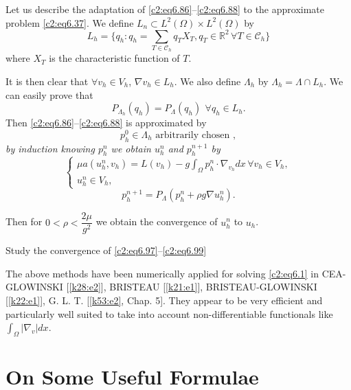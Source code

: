Let us describe the adaptation of \eqref{c2:eq6.86}--\eqref{c2:eq6.88} to the approximate
problem \eqref{c2:eq6.37}. We define $L_n \subset L^2 (\Omega) \times L^2
(\Omega)$ by  
$$ 
L_h = \{q_h : q_h = \sum_{T \in \mathscr{C}_h} q_T X_T, q_T
\in \mathbb{R}^2 \, \forall  T \in  \mathscr{C}_h\} 
$$\pageoriginale 
where $X_T$ is the characteristic function of $T$.

It is then clear that $\forall v_h \in V_h$, $\nabla v_h \in
L_h$. We also define $\Lambda_h$ by $\Lambda_h = \Lambda \cap L_h$. We
can easily prove that  
$$
P_{\Lambda_{h}} (q_h) = P_\Lambda (q_h) ~\, \forall  q_h \in L_h.
$$
Then \eqref{c2:eq6.86}--\eqref{c2:eq6.88} is approximated by
\begin{equation}
p^0_h \in \Lambda_h \text { arbitrarily chosen },
\tag{6.97}\label{c2:eq6.97} 
\end{equation}
\textit {by induction knowing $p^n_h$ we obtain $u^n_h$ and
  $p^{n+1}_h$ by} 
\begin{equation}
\begin{cases}
\mu a (u^n_h, v_h) = L (v_h)-g \int_\Omega p^n_h \cdot
\nabla_{v_{h}} dx\, \forall  v_h \in V_h,\\ 
u^n_h \in V_h, \tag{6.98}\label{c2:eq6.98} 
\end{cases}
\end{equation}
\begin{equation}
p^{n+1}_h = P_\Lambda (p^n_h + \rho g \nabla u^n_h).\tag{6.99}\label{c2:eq6.99} 
\end{equation}

Then for $0 < \rho < \dfrac{2 \mu}{g^2}$ we obtain the convergence of
$u^n_h$ to $u_h$. 

\begin{exercise}\label{c2:exer6.6} %
Study the convergence  of \eqref{c2:eq6.97}--\eqref{c2:eq6.99} 
\end{exercise}

\begin{remark}\label{c2:rem6.9}%
The above methods have been numerically applied for solving \eqref{c2:eq6.1} in
CEA-GLOWINSKI [\ref{k28:e2}], BRISTEAU [\ref{k21:e1}],
BRISTEAU-GLOWINSKI [\ref{k22:e1}], G. L. T. [\ref{k53:e2},
  Chap. 5]. They appear to be very efficient and particularly well
suited to take into account  non-differentiable functionals like
$\int_\Omega |\nabla_v| dx$.  
\end{remark}

\section{On Some Useful Formulae}\label{c2:s7}

